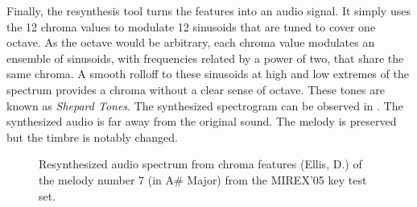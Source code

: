 \documentclass{article}
\begin{document}
Finally, the resynthesis tool turns the features into an audio signal. It simply uses the 12 chroma values to modulate 12 sinusoids that are tuned to cover one octave. As the octave would be arbitrary, each chroma value modulates an ensemble of sinusoids, with frequencies related by a power of two, that share the same chroma. A smooth rolloff to these sinusoids at high and low extremes of the spectrum provides a chroma without a clear sense of octave. These tones are known as {\it Shepard Tones}. The synthesized spectrogram can be observed in . The synthesized audio is far away from the original sound. The melody is preserved but the timbre is notably changed. 

\begin{figure}
 \centerline{}
 \caption{Resynthesized audio spectrum from chroma features (Ellis, D.) of the melody number 7 (in A\# Major) from the MIREX'05 key test set.}
 \label{fig:resynth07ellis}
\end{figure}
\end{document}
